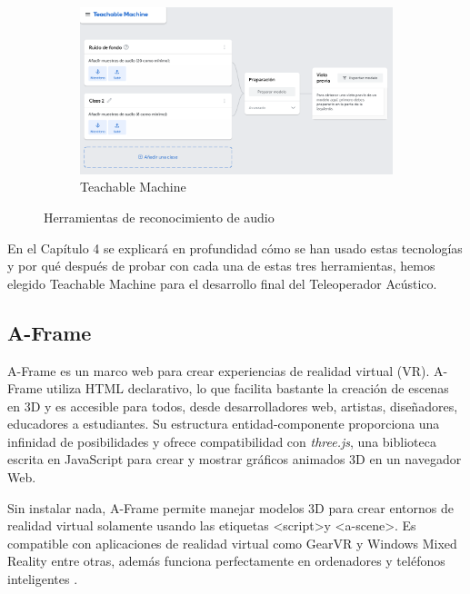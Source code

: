 \begin{figure}[H]
\begin{subfigure}{.3\linewidth}
       \includegraphics[width=1\textwidth, height=0.7\textwidth]{chapters/images/tm.png}
        \caption{Teachable Machine}
    \end{subfigure}
    \caption{Herramientas de reconocimiento de audio}
\end{figure}


En el Capítulo 4 se explicará en profundidad cómo se han usado estas tecnologías y por qué después de probar con cada una de estas tres herramientas, hemos elegido Teachable Machine para el desarrollo final del Teleoperador Acústico.


\subsection{A-Frame}

A-Frame es un marco web para crear experiencias de realidad virtual (VR). A-Frame utiliza HTML declarativo, lo que facilita bastante la creación de escenas en 3D y es accesible para todos, desde desarrolladores web, artistas, diseñadores, educadores a estudiantes. Su estructura entidad-componente proporciona una infinidad de posibilidades y ofrece compatibilidad con \textit{three.js}, una biblioteca  escrita en JavaScript para crear y mostrar gráficos animados 3D en un navegador Web. 

Sin instalar nada, A-Frame permite manejar modelos 3D para crear entornos de realidad virtual solamente usando las etiquetas \textless script\textgreater  y \textless a-scene\textgreater. Es compatible con aplicaciones de realidad virtual como GearVR y Windows Mixed Reality entre otras, además funciona perfectamente en ordenadores y teléfonos inteligentes \cite{aframe}. 


